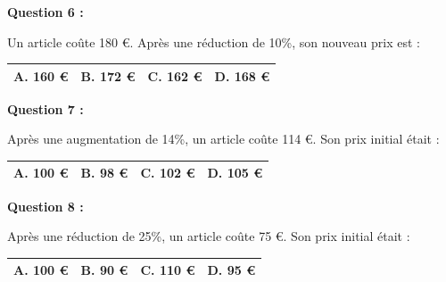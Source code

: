 \documentclass[12pt,a4paper]{article}
\begin{document}
\vspace{0.7cm}

\textbf{Question 6 :}
\vspace{5pt}

Un article coûte 180 €. Après une réduction de 10\%, son nouveau prix est :
\vspace{0.3cm}

\renewcommand{\arraystretch}{3}
\begin{tabular}{|m{3.4cm}|m{3.4cm}|m{3.4cm}|m{3.4cm}|}
\hline
\centering \vspace{-0.3cm} \textbf{A.} 160 € & 
\centering \vspace{-0.3cm} \textbf{B.} 172 € & 
\centering \vspace{-0.3cm} \textbf{C.} 162 € & 
\centering \vspace{-0.3cm} \textbf{D.} 168 € \tabularnewline
\hline
\end{tabular}

\vspace{0.7cm}

\textbf{Question 7 :}
\vspace{5pt}

Après une augmentation de 14\%, un article coûte 114 €. Son prix initial était :
\vspace{0.3cm}

\renewcommand{\arraystretch}{3}
\begin{tabular}{|m{3.4cm}|m{3.4cm}|m{3.4cm}|m{3.4cm}|}
\hline
\centering \vspace{-0.3cm} \textbf{A.} 100 € & 
\centering \vspace{-0.3cm} \textbf{B.} 98 € & 
\centering \vspace{-0.3cm} \textbf{C.} 102 € & 
\centering \vspace{-0.3cm} \textbf{D.} 105 € \tabularnewline
\hline
\end{tabular}

\vspace{0.7cm}

\textbf{Question 8 :}
\vspace{5pt}

Après une réduction de 25\%, un article coûte 75 €. Son prix initial était :
\vspace{0.3cm}

\renewcommand{\arraystretch}{3}
\begin{tabular}{|m{3.4cm}|m{3.4cm}|m{3.4cm}|m{3.4cm}|}
\hline
\centering \vspace{-0.3cm} \textbf{A.} 100 € & 
\centering \vspace{-0.3cm} \textbf{B.} 90 € & 
\centering \vspace{-0.3cm} \textbf{C.} 110 € & 
\centering \vspace{-0.3cm} \textbf{D.} 95 € \tabularnewline
\hline
\end{tabular}
\end{document}
